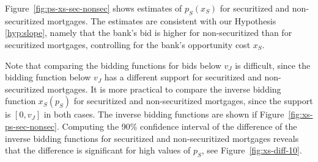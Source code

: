 \documentclass[11pt,twopage]{article}
\begin{document}
Figure~\ref{fig:ps-xs-sec-nonsec} shows estimates of $p_S(x_S)$ for securitized and non-securitized mortgages. The estimates are consistent with our Hypothesis \ref{hyp:slope}, namely that the bank's bid is higher for non-securitized than for securitized mortgages, controlling for the bank's opportunity cost $x_S$.

Note that comparing the bidding functions for bids below $v_J$ is difficult, since the bidding function below $v_J$ has a different support for securitized and non-securitized mortgages. It is more practical to compare the inverse bidding function $x_S(p_S)$ for securitized and non-securitized mortgages, since the support is $[0,v_J]$ in both cases. The inverse bidding functions are shown if Figure~\ref{fig:xs-ps-sec-nonsec}. Computing the 90\% confidence interval of the difference of the inverse bidding functions for securitized and non-securitized mortgages reveals that the difference is significant for high values of $p_S$, see Figure~\ref{fig:xs-diff-10}. 
\end{document}
